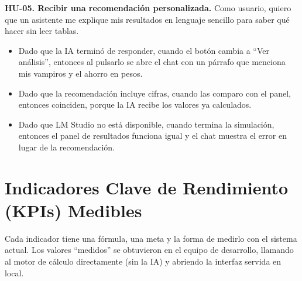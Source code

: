 \documentclass[10pt,journal,compsoc]{IEEEtran}
\begin{document}
\textbf{HU-05. Recibir una recomendación personalizada.} Como usuario, quiero que un asistente me explique mis resultados en lenguaje sencillo para saber qué hacer sin leer tablas.
\begin{itemize}
\item Dado que la IA terminó de responder, cuando el botón cambia a ``Ver análisis'', entonces al pulsarlo se abre el chat con un párrafo que menciona mis vampiros y el ahorro en pesos.
\item Dado que la recomendación incluye cifras, cuando las comparo con el panel, entonces coinciden, porque la IA recibe los valores ya calculados.
\item Dado que LM Studio no está disponible, cuando termina la simulación, entonces el panel de resultados funciona igual y el chat muestra el error en lugar de la recomendación.
\end{itemize}

\section{Indicadores Clave de Rendimiento (KPIs) Medibles}
Cada indicador tiene una fórmula, una meta y la forma de medirlo con el sistema actual. Los valores ``medidos'' se obtuvieron en el equipo de desarrollo, llamando al motor de cálculo directamente (sin la IA) y abriendo la interfaz servida en local.
\end{document}
